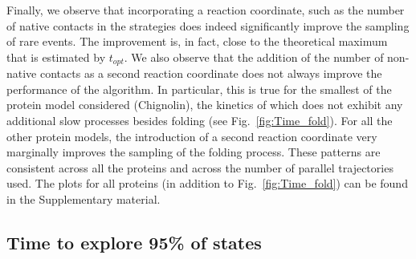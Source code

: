 Finally, we observe that incorporating a reaction coordinate, such as the
number of native contacts in the strategies does indeed significantly improve
the sampling of rare events. The improvement is, in fact, close to the
theoretical maximum that is estimated by $t_{opt}$. We also observe that the
addition of the number of non-native contacts as a second reaction coordinate
does not always improve the performance of the algorithm. In particular, this
is true for the smallest of the protein model considered (Chignolin), the
kinetics of which does not exhibit any additional slow processes besides
folding (see Fig.~\ref{fig:Time_fold}). For all the other protein models, the
introduction of a second reaction coordinate very marginally improves the
sampling of the folding process.
These patterns are consistent across all the proteins and across the number of
parallel trajectories used. The plots for all proteins (in addition to
Fig.~\ref{fig:Time_fold}) can be found in the Supplementary material.


\subsection{\label{sec:time-explore}Time to explore 95\% of states}

